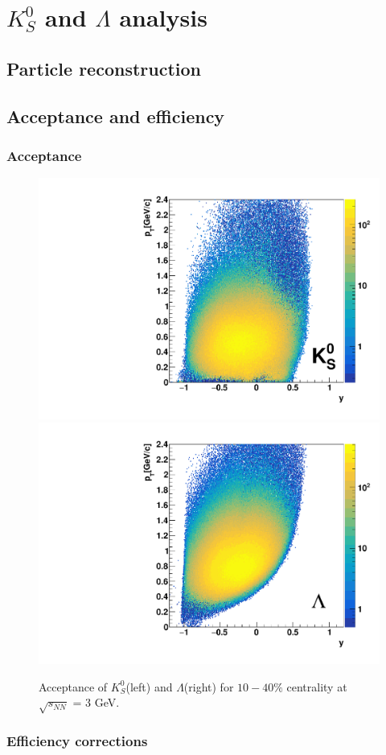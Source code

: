 \section{$K^0_S$ and $\Lambda$ analysis} 
\subsection{Particle reconstruction}
\subsection{Acceptance and efficiency}
\subsubsection{Acceptance}

\begin{figure}[h]
\includegraphics[width=0.49\linewidth]{chapterX/fig/ks_acceptance_v15.pdf}
\includegraphics[width=0.49\linewidth]{chapterX/fig/ld_acceptance_v15.pdf}
\caption{Acceptance of $K^0_S$(left) and $\Lambda$(right) for $10-40\%$ centrality at $\sqrt{s_{NN}}$ = 3 GeV.}
\label{ldks_acceptance}
\end{figure}



\subsubsection{Efficiency corrections}

